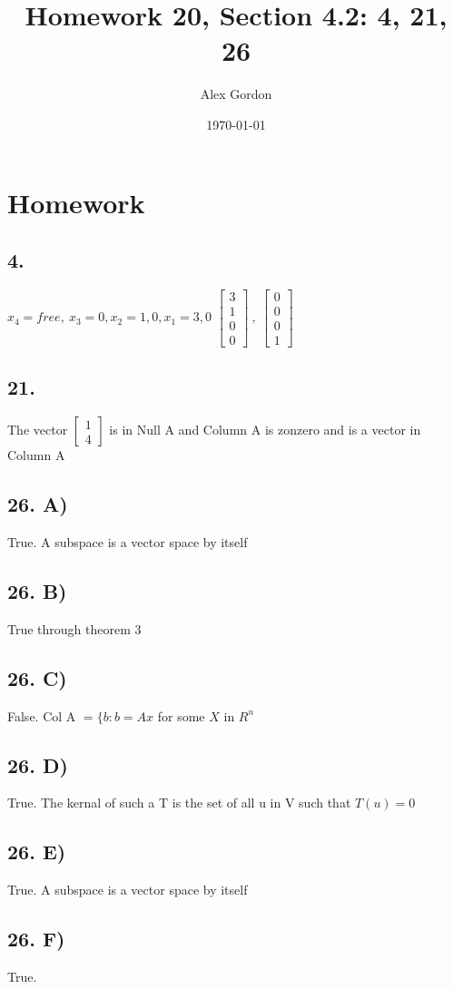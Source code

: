 \documentclass[12]{scrartcl}
\begin{document}
\title{Homework 20, Section 4.2: 4, 21, 26}
\author{Alex Gordon}
\date{\today}
\maketitle
\section*{Homework}
\subsection*{4.}
$x_4 = free, \  x_3 = 0, x_2 = 1, 0, x_1 = 3, 0$
$ \begin{bmatrix}  3  \\  1 \\ 0 \\ 0  \end{bmatrix} \ , \  \begin{bmatrix}  0  \\  0 \\ 0 \\ 1 \end{bmatrix}$
\subsection*{21. }
The vector $\begin{bmatrix}  1  \\  4  \end{bmatrix} $ is in Null A and Column A is zonzero and is a vector in Column A 
\subsection*{26. A)}
True. A subspace is a vector space by itself
\subsection*{26. B)}
True through theorem 3
\subsection*{26. C)}
False. Col A $= \{b : b = Ax$ for some $ X$ in $R^n$
\subsection*{26. D)}
True. The kernal of such a T is the set of all u in V such that $T(u)  = 0$
\subsection*{26. E)}
True. A subspace is a vector space by itself
\subsection*{26. F)}
True. 
\end{document}
